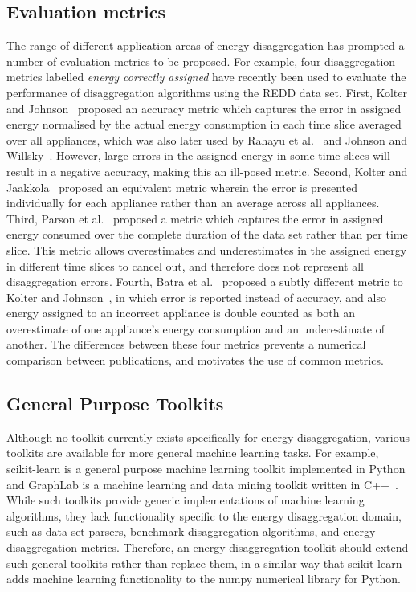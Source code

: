 \documentclass{sig-alternate}
\begin{document}
\subsection{Evaluation metrics}
\label{sec:evaluation_metrics}
\noindent The range of different application areas of energy disaggregation has prompted a number of evaluation metrics to be proposed. For example, four disaggregation metrics labelled \emph{energy correctly assigned} have recently been used to evaluate the performance of disaggregation algorithms using the REDD data set. First, Kolter and Johnson~\cite{redd} proposed an accuracy metric which captures the error in assigned energy normalised by the actual energy consumption in each time slice averaged over all appliances, which was also later used by Rahayu et al.~\cite{rahayu_2012} and Johnson and Willsky~\cite{johnson_2013}. However, large errors in the assigned energy in some time slices will result in a negative accuracy, making this an ill-posed metric. Second, Kolter and Jaakkola~\cite{kolter_2012} proposed an equivalent metric wherein the error is presented individually for each appliance rather than an average across all appliances. Third, Parson et al.~\cite{parson_2012} proposed a metric which captures the error in assigned energy consumed over the complete duration of the data set rather than per time slice. This metric allows overestimates and underestimates in the assigned energy in different time slices to cancel out, and therefore does not represent all disaggregation errors. Fourth, Batra et al.~\cite{batra_2013} proposed a subtly different metric to Kolter and Johnson~\cite{redd}, in which error is reported instead of accuracy, and also energy assigned to an incorrect appliance is double counted as both an overestimate of one appliance's energy consumption and an underestimate of another. The differences between these four metrics prevents a numerical comparison between publications, and motivates the use of common metrics.

\subsection{General Purpose Toolkits}
\label{sec:need_nilm_toolkit}
\noindent Although no toolkit currently exists specifically for energy disaggregation, various toolkits are available for more general machine learning tasks. For example, scikit-learn is a general purpose machine learning toolkit implemented in Python~\cite{scikit} and GraphLab is a machine learning and data mining toolkit written in C++~\cite{graphlab}. While such toolkits provide generic implementations of machine learning algorithms, they lack functionality specific to the energy disaggregation domain, such as data set parsers, benchmark disaggregation algorithms, and energy disaggregation metrics. Therefore, an energy disaggregation toolkit should extend such general toolkits rather than replace them, in a similar way that scikit-learn adds machine learning functionality to the numpy numerical library for Python. 
\end{document}
